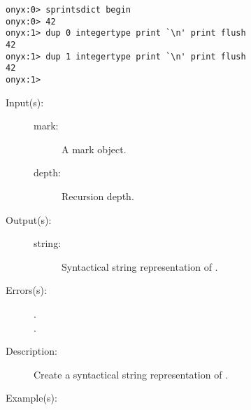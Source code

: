 \begin{description}
\begin{description}
\begin{verbatim}
onyx:0> sprintsdict begin
onyx:0> 42
onyx:1> dup 0 integertype print `\n' print flush
42
onyx:1> dup 1 integertype print `\n' print flush
42
onyx:1>
		\end{verbatim}
	\end{description}
\label{sprintsdict:marktype}
\item[{\onyxop{mark depth}{marktype}{string}}: ]
	\begin{description}\item[]
	\item[Input(s): ]
		\begin{description}\item[]
		\item[mark: ]
			A mark object.
		\item[depth: ]
			Recursion depth.
		\end{description}
	\item[Output(s): ]
		\begin{description}\item[]
		\item[string: ]
			Syntactical string representation of .
		\end{description}
	\item[Errors(s): ]
		\begin{description}\item[]
		\item[.]
		\item[.]
		\end{description}
	\item[Description: ]
		Create a syntactical string representation of .
	\item[Example(s): ]\begin{verbatim}


\end{verbatim}
\end{description}
\end{description}
